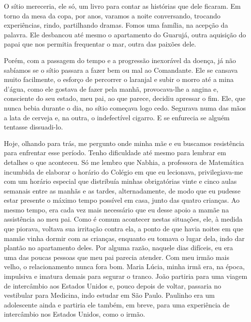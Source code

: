 O sítio mereceria, ele só, um livro para contar as histórias que dele ficaram.
Em torno da mesa da copa, por anos, varamos a noite conversando, trocando experiências, rindo, partilhando dramas.
Fomos uma família, na acepção da palavra.
Ele desbancou até mesmo o apartamento do Guarujá, outra aquisição do papai que nos permitia frequentar o mar, outra das paixões dele.


Porém, com a passagem do tempo e a progressão inexorável da doença, já não sabíamos se o sítio passara a fazer bem ou mal ao Comandante.
Ele se cansava muito facilmente, o esforço de percorrer o laranjal e subir o morro até a mina d’água, como ele gostava de fazer pela manhã, provocava-lhe a angina e, consciente do seu estado, meu pai, ao que parece, decidiu apressar o fim.
Ele, que nunca bebia durante o dia, no sítio começava logo cedo.
Segurava numa das mãos a lata de cerveja e, na outra, o indefectível cigarro.
E se enfurecia se alguém tentasse dissuadi-lo.


Hoje, olhando para trás, me pergunto onde minha mãe e eu buscamos resistência para enfrentar esse período. 
Tenho dificuldade até mesmo para lembrar em detalhes o que aconteceu.
Só me lembro que Nabhia, a professora de Matemática incumbida de elaborar o horário do Colégio em que eu lecionava, privilegiava-me com um horário especial que distribuía minhas obrigatórias vinte e cinco aulas semanais entre as manhãs e as tardes, alternadamente, de modo que eu pudesse estar presente o máximo tempo possível em casa, junto das quatro crianças.
Ao mesmo tempo, era cada vez mais necessário que eu desse apoio a mamãe na assistência ao meu pai.
Como é comum acontecer nestas situações, ele, à medida que piorava, voltava sua irritação contra ela, a ponto de que havia noites em que mamãe vinha dormir com as crianças, enquanto eu tomava o lugar dela, indo dar plantão no apartamento deles.
Por alguma razão, naquele dias difíceis, eu era uma das poucas pessoas que meu pai parecia atender.
Com meu irmão mais velho, o relacionamento nunca fora bom.
Maria Lúcia, minha irmã era, na época, impulsiva e imatura demais para segurar o tranco.
João partiria para uma viagem de intercâmbio aos Estados Unidos e, pouco depois de voltar, passaria no vestibular para Medicina, indo estudar em São Paulo.
Paulinho era um adolescente ainda e partiria ele também, em breve, para uma experiência de intercâmbio nos Estados Unidos, como o irmão.

